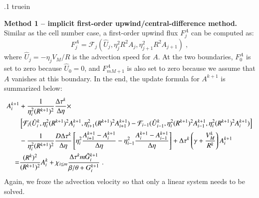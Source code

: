 \documentclass{amsart}
\theoremstyle{definition}
\theoremstyle{remark}
\numberwithin{equation}{section}
\numberwithin{figure}{section}
\begin{document}
\vglue .1 truein

\noindent
{\bf Method 1 -- implicit first-order upwind/central-difference method.}
Similar as the cell number case, a first-order upwind flux $F_j^A$ can be computed as:
\begin{displaymath}
F_j^A = \mathcal{F}_j(\hat{U}_j,\eta_j^2R^2A_j,\eta_{j+1}^2R^2A_{j+1})\;,
\end{displaymath}
where $\hat{U}_j=-\eta_jV_M/R$ is the advection speed for $A$.
At the two boundaries, $F_0^A$ is set to zero because $\hat{U}_0=0$, and $F_{mM+1}^A$ is also set to zero because we assume that $A$ vanishes at this boundary.
In the end, the update formula for $A^{k+1}$ is summarized below:
\begin{align}
\label{eq:num_im_upw_chem}
A_i^{k+1} &+ \frac{1}{\eta_i^2(R^{k+1})^2}\frac{\Delta\tau^k}{\Delta\eta}\times \\ 
\notag
&\left[\mathcal{F}_i(\hat{U}_i^k,\eta_i^2(R^{k+1})^2A_i^{k+1},\eta_{i+1}^2(R^{k+1})^2A_{i+1}^{k+1})-\mathcal{F}_{i-1}(\hat{U}_{i-1}^k,\eta_i^2(R^{k+1})^2A_{i-1}^{k+1},\eta_i^2(R^{k+1})^2A_i^{k+1})\right] \\
\notag
&-\frac{1}{\eta_i^2(R^{k+1})^2}\frac{D\Delta\tau^k}{\Delta\eta}\left[\eta_i^2\frac{A_{i+1}^{k+1}-A_i^{k+1}}{\Delta\eta}-\eta_{i-1}^2\frac{A_i^{k+1}-A_{i-1}^{k+1}}{\Delta\eta}\right] + \Delta\tau^k\left(\gamma+\frac{V_M^k}{R^k}\right)A_i^{k+1} \\
\notag
= & \frac{(R^k)^2}{(R^{k+1})^2}A_i^k + \chi_{i\le m}\frac{\Delta\tau^k m\tilde{G}_i^{k+1}}{\beta/\theta+G_i^{k+1}}\;.
\end{align}
Again, we froze the advection velocity so that only a linear system needs to be solved.
\end{document}
